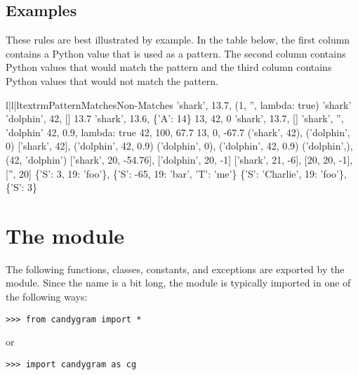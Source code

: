 \documentclass{howto}
\newcommand{\lessthan}[0]{\begin{math}<\end{math}}
\newcommand{\greaterthan}[0]{\begin{math}>\end{math}}
\newcommand{\lessthan}[0]{<}
\newcommand{\greaterthan}[0]{>}
\begin{document}
\subsection{Examples}
These rules are best illustrated by example. In the table below, the first
column contains a Python value that is used as a pattern. The second column
contains Python values that would match the pattern and the third column
contains Python values that would not match the pattern.
\begin{tableiii}{l|l|l}{textrm}{Pattern}{Matches}{Non-Matches}
	{'shark', 13.7, (1, '', lambda: true)}
	{}
	{'shark'}
	{'dolphin', 42, []}
	{13.7}
	{'shark', 13.6, \{'A': 14\}}
	{13, 42, 0}
	{'shark', 13.7, []}
	{'shark', '', 'dolphin'}
	{42, 0.9, lambda: true}
\lineiii{lambda x: x \greaterthan\ 20}
	{42, 100, 67.7}
	{13, 0, -67.7}
	{('shark', 42), ('dolphin', 0)}
	{['shark', 42], ('dolphin', 42, 0.9)}
	{('dolphin', 0), ('dolphin', 42, 0.9)}
	{('dolphin',), (42, 'dolphin')}
\lineiii{[str, 20, lambda x: x \lessthan\ 0]}
	{['shark', 20, -54.76], ['dolphin', 20, -1]}
	{['shark', 21, -6], [20, 20, -1], ['', 20]}
	{\{'S': 3, 19: 'foo'\}, \{'S': -65, 19: 'bar', 'T': 'me'\}}
	{\{'S': 'Charlie', 19: 'foo'\}, \{'S': 3\}}
\end{tableiii}



\section{The  module}


The following functions, classes, constants, and exceptions are exported by the
 module. Since the name  is a bit long, the
module is typically imported in one of the following ways:
\begin{verbatim}
>>> from candygram import *
\end{verbatim}
or
\begin{verbatim}
>>> import candygram as cg
\end{verbatim}



\end{document}
